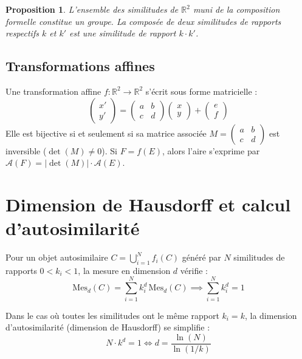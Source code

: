 \documentclass[11pt,a4paper]{article}
\newtheorem{proposition}{Proposition}[section]
\begin{document}
\begin{proposition}
L'ensemble des similitudes de $\mathbb{R}^2$ muni de la composition formelle constitue un groupe. La composée de deux similitudes de rapports respectifs $k$ et $k'$ est une similitude de rapport $k \cdot k'$.
\end{proposition}

\subsection{Transformations affines}
Une transformation affine $f: \mathbb{R}^2 \to \mathbb{R}^2$ s'écrit sous forme matricielle :
\begin{equation}
\begin{pmatrix} x' \\ y' \end{pmatrix} = \begin{pmatrix} a & b \\ c & d \end{pmatrix} \begin{pmatrix} x \\ y \end{pmatrix} + \begin{pmatrix} e \\ f \end{pmatrix}
\end{equation}
Elle est bijective si et seulement si sa matrice associée $M = \begin{pmatrix} a & b \\ c & d \end{pmatrix}$ est inversible ($\det(M) \neq 0$). Si $F = f(E)$, alors l'aire s'exprime par $\mathcal{A}(F) = |\det(M)| \cdot \mathcal{A}(E)$.

\section{Dimension de Hausdorff et calcul d'autosimilarité}

Pour un objet autosimilaire $C = \bigcup_{i=1}^N f_i(C)$ généré par $N$ similitudes de rapports $0 < k_i < 1$, la mesure en dimension $d$ vérifie :
\begin{equation}
\mathrm{Mes}_d(C) = \sum_{i=1}^N k_i^d \, \mathrm{Mes}_d(C) \implies \sum_{i=1}^N k_i^d = 1
\end{equation}

Dans le cas où toutes les similitudes ont le même rapport $k_i = k$, la dimension d'autosimilarité (dimension de Hausdorff) se simplifie :
\begin{equation}
N \cdot k^d = 1 \iff d = \frac{\ln(N)}{\ln(1/k)}
\end{equation}
\end{document}
